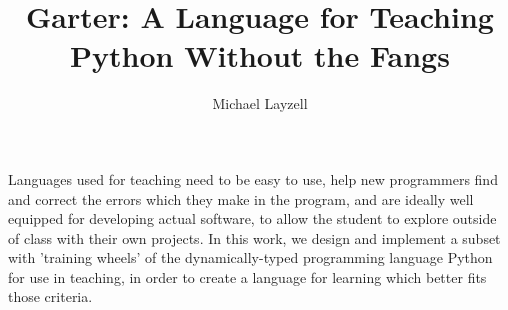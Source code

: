 






\title{Garter: A Language for Teaching Python Without the Fangs}

\author{Michael Layzell}



\beforepreface



Languages used for teaching need to be easy to use, help new programmers find
and correct the errors which they make in the program, and are ideally well
equipped for developing actual software, to allow the student to explore outside
of class with their own projects. In this work, we design and implement
a subset with 'training wheels' of the dynamically-typed programming language
Python \cite{pythonweb} for use in teaching, in order to create a language for
learning which better fits those criteria.



